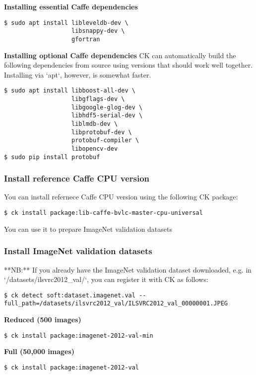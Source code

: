 \documentclass[sigplan]{acmart}
\begin{document}
\textbf{Installing essential Caffe dependencies}
\begin{verbatim}
$ sudo apt install libleveldb-dev \
                   libsnappy-dev \
                   gfortran
\end{verbatim}

\textbf{Installing optional Caffe dependencies}
CK can automatically build the following dependencies from source using versions that should work well together. Installing via `apt`, however, is somewhat faster.

\begin{verbatim}
$ sudo apt install libboost-all-dev \
                   libgflags-dev \
                   libgoogle-glog-dev \
                   libhdf5-serial-dev \
                   liblmdb-dev \
                   libprotobuf-dev \
                   protobuf-compiler \
                   libopencv-dev
$ sudo pip install protobuf
\end{verbatim}

\subsubsection{Install reference Caffe CPU version}

You can install refernece Caffe CPU version using the following CK package:
\begin{verbatim}
$ ck install package:lib-caffe-bvlc-master-cpu-universal
\end{verbatim}

You can use it to prepare ImageNet validation datasets

\subsubsection{Install ImageNet validation datasets}

**NB:** If you already have the ImageNet validation dataset downloaded, e.g. in
`/datasets/ilsvrc2012\_val/`, you can register it with CK as follows:

\begin{verbatim}
$ ck detect soft:dataset.imagenet.val --full_path=/datasets/ilsvrc2012_val/ILSVRC2012_val_00000001.JPEG
\end{verbatim}

\textbf{Reduced (500 images)}
\begin{verbatim}
$ ck install package:imagenet-2012-val-min
\end{verbatim}

\textbf{Full (50,000 images)}
\begin{verbatim}
$ ck install package:imagenet-2012-val
\end{verbatim}
\end{document}
